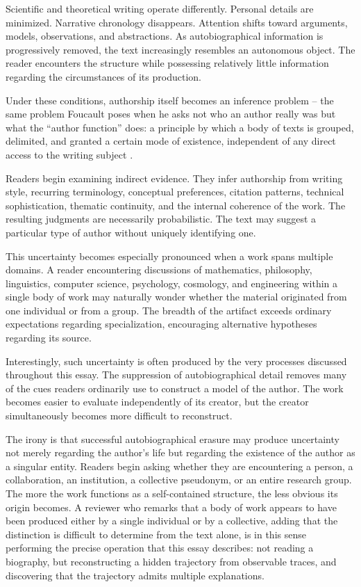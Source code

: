 \documentclass[11pt]{article}
\theoremstyle{plain}
\begin{document}
Scientific and theoretical writing operate differently. Personal details are minimized. Narrative chronology disappears. Attention shifts toward arguments, models, observations, and abstractions. As autobiographical information is progressively removed, the text increasingly resembles an autonomous object. The reader encounters the structure while possessing relatively little information regarding the circumstances of its production.

Under these conditions, authorship itself becomes an inference problem -- the same problem Foucault poses when he asks not who an author really was but what the ``author function'' does: a principle by which a body of texts is grouped, delimited, and granted a certain mode of existence, independent of any direct access to the writing subject \cite{foucault1977}.

Readers begin examining indirect evidence. They infer authorship from writing style, recurring terminology, conceptual preferences, citation patterns, technical sophistication, thematic continuity, and the internal coherence of the work. The resulting judgments are necessarily probabilistic. The text may suggest a particular type of author without uniquely identifying one.

This uncertainty becomes especially pronounced when a work spans multiple domains. A reader encountering discussions of mathematics, philosophy, linguistics, computer science, psychology, cosmology, and engineering within a single body of work may naturally wonder whether the material originated from one individual or from a group. The breadth of the artifact exceeds ordinary expectations regarding specialization, encouraging alternative hypotheses regarding its source.

Interestingly, such uncertainty is often produced by the very processes discussed throughout this essay. The suppression of autobiographical detail removes many of the cues readers ordinarily use to construct a model of the author. The work becomes easier to evaluate independently of its creator, but the creator simultaneously becomes more difficult to reconstruct.

The irony is that successful autobiographical erasure may produce uncertainty not merely regarding the author's life but regarding the existence of the author as a singular entity. Readers begin asking whether they are encountering a person, a collaboration, an institution, a collective pseudonym, or an entire research group. The more the work functions as a self-contained structure, the less obvious its origin becomes. A reviewer who remarks that a body of work appears to have been produced either by a single individual or by a collective, adding that the distinction is difficult to determine from the text alone, is in this sense performing the precise operation that this essay describes: not reading a biography, but reconstructing a hidden trajectory from observable traces, and discovering that the trajectory admits multiple explanations.
\end{document}
